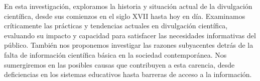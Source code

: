 En esta investigación, exploramos la historia y situación actual de la divulgación científica, desde sus comienzos en el siglo XVII hasta hoy en día. Examinamos críticamente las prácticas y tendencias actuales en divulgación científica, evaluando su impacto y capacidad para satisfacer las necesidades informativas del público. También nos proponemos investigar las razones subyacentes detrás de la falta de información científica básica en la sociedad contemporánea. Nos sumergiremos en las posibles causas que contribuyen a esta carencia, desde deficiencias en los sistemas educativos hasta barreras de acceso a la información.
